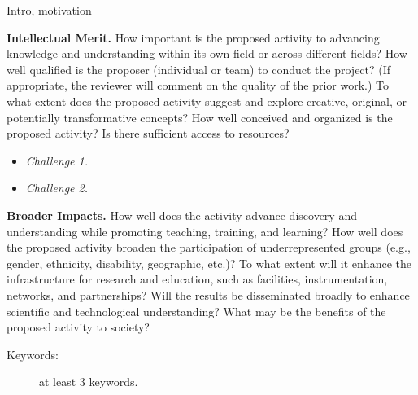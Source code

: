 

Intro, motivation


\textbf{Intellectual Merit.}
How important is the proposed activity to advancing knowledge and understanding within its own field or across different fields? How well qualified is the proposer (individual or team) to conduct the project? (If appropriate, the reviewer will comment on the quality of the prior work.) To what extent does the proposed activity suggest and explore creative, original, or potentially transformative concepts? How well conceived and organized is the proposed activity? Is there sufficient access to resources?
%
\vspace{-.5\baselineskip}%
\begin{itemize}
	\item \textit{Challenge 1.}

\vspace{-.5\baselineskip}%
	\item \textit{Challenge 2.}
  
\end{itemize}


\textbf{Broader Impacts.}
How well does the activity advance discovery and understanding while promoting teaching, training, and learning? How well does the proposed activity broaden the participation of underrepresented groups (e.g., gender, ethnicity, disability, geographic, etc.)? To what extent will it enhance the infrastructure for research and education, such as facilities, instrumentation, networks, and partnerships? Will the results be disseminated broadly to enhance scientific and technological understanding? What may be the benefits of the proposed activity to society?

\begin{description}
	\item[Keywords:]
   at least 3 keywords.
\end{description}
